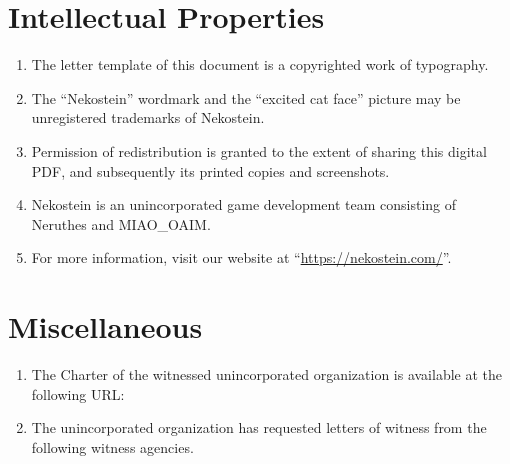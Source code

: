 \fakenewdoc
{}



\clearpage





\fakenewdoc
{}



\clearpage





\fakenewdoc
{}


\section{Intellectual Properties}
\begin{enumerate}
    \item The letter template of this document is a copyrighted work of typography.
    \item The ``Nekostein'' wordmark and the ``excited cat face'' picture may be unregistered trademarks of Nekostein.
    \item Permission of redistribution is granted to the extent of sharing this digital PDF,
        and subsequently its printed copies and screenshots.
    \item Nekostein is an unincorporated game development team consisting of Neruthes and MIAO\_OAIM.
    \item For more information, visit our website at ``\href{https://nekostein.com/}{https://nekostein.com/}''.
\end{enumerate}

\section{Miscellaneous}
\begin{enumerate}
    \item The Charter of the witnessed unincorporated organization is available at the following URL:\\
        
    \item The unincorporated organization has requested letters of witness from the following witness agencies.
    \begin{itemize}
        
    \end{itemize}
\end{enumerate}









